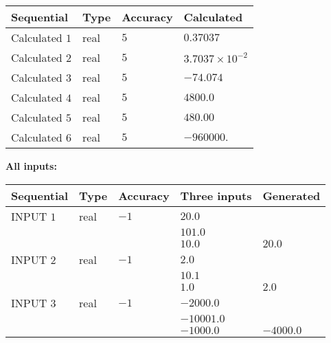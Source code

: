 \documentclass[12pt]{article}
\begin{document}
   
   
   
\noindent{}
   
   
  
  
\noindent\begin{tabular}{|l|l|l|l|}
\hline
 Sequential & Type & Accuracy & Calculated \\ 
\hline
 
 
  Calculated $            1 $ & real & $            5  $ & 
 $ 0.37037 $ 
 \\  \hline  
 
 
  Calculated $            2 $ & real & $            5  $ & 
 $ 3.7037 \times 10^{-2} $ 
 \\  \hline  
 
 
  Calculated $            3 $ & real & $            5  $ & 
 $ -74.074 $ 
 \\  \hline  
 
 
  Calculated $            4 $ & real & $            5  $ & 
 $ 4800.0 $ 
 \\  \hline  
 
 
  Calculated $            5 $ & real & $            5  $ & 
 $ 480.00 $ 
 \\  \hline  
 
 
  Calculated $            6 $ & real & $            5  $ & 
 $ -960000. $ 
 \\  \hline  
 \end{tabular}
   
   
   
   
\noindent\vspace{0.1in}\hspace{-0.08in} {\textbf{\Large{All inputs: }}}
   
   
  
  
\noindent\begin{tabular}{|l|l|l|l|l|}
\hline
 Sequential & Type & Accuracy & Three inputs & Generated \\ 
\hline
 
 
  INPUT $            1 $ & real & $           -1  $ & $
 20.0
  $ & \\
  & & &  $
 101.0
  $ & \\
  & & &  $
 10.0
 $ & $ 20.0 $ 
 \\  \hline  
 
 
  INPUT $            2 $ & real & $           -1  $ & $
 2.0
  $ & \\
  & & &  $
 10.1
  $ & \\
  & & &  $
 1.0
 $ & $ 2.0 $ 
 \\  \hline  
 
 
  INPUT $            3 $ & real & $           -1  $ & $
 -2000.0
  $ & \\
  & & &  $
 -10001.0
  $ & \\
  & & &  $
 -1000.0
 $ & $ -4000.0 $ 
 \\  \hline  
 \end{tabular}
   
\end{document}
